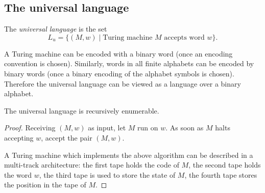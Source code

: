 \begin{page}
\setcounter{section}{8}
\setcounter{subsection}{4}
\setcounter{dfn}{5}
\label{portion:1196}

\subsection{The universal language}

\end{page}

\begin{page}
\setcounter{section}{8}
\setcounter{subsection}{4}
\setcounter{dfn}{6}
\label{portion:1198}

\begin{dfn}
The \emph{universal language} is the set
\[
L_u = \{(M,w) \mid \text{Turing machine }M \text{ accepts word }w\}.
\]
\end{dfn}

\end{page}

\begin{page}
\setcounter{section}{8}
\setcounter{subsection}{4}
\setcounter{dfn}{6}
\label{portion:1199}

A Turing machine can be encoded with a binary word (once an encoding convention is chosen).
Similarly, words in all finite alphabets can be encoded by binary words (once a binary encoding of the alphabet symbols is chosen).
Therefore the universal language can be viewed as a language over a binary alphabet.


\end{page}

\begin{page}
\setcounter{section}{8}
\setcounter{subsection}{4}
\setcounter{dfn}{7}
\label{portion:1201}

\begin{lem}
\label{lem:UniLangRE}
The universal language is recursively enumerable.
\end{lem}

\end{page}

\begin{page}
\setcounter{section}{8}
\setcounter{subsection}{5}
\setcounter{dfn}{7}
\label{portion:1202}

\begin{proof}
Receiving $(M, w)$ as input, let $M$ run on $w$.
As soon as $M$ halts accepting $w$, accept the pair $(M,w)$.

A Turing machine which implements the above algorithm can be described in a multi-track architecture:
the first tape holds the code of $M$, the second tape holds the word $w$, the third tape is used to store the state of $M$,
the fourth tape stores the position in the tape of $M$.
\end{proof}





\end{page}

